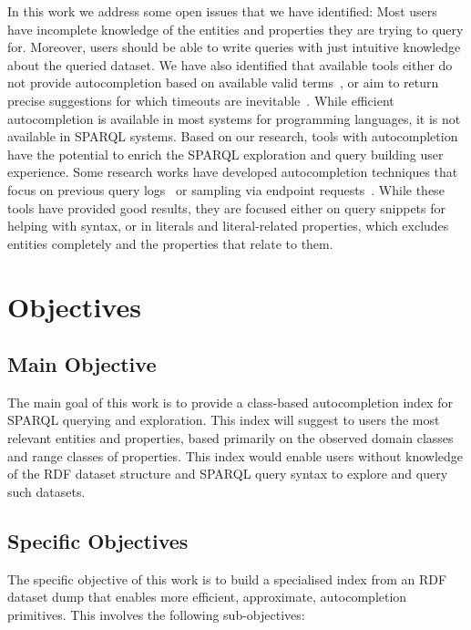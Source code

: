 In this work we address some open issues that we have identified: 
Most users have incomplete knowledge of the entities and properties they are trying to query for.
Moreover, users should be able to write queries with just intuitive knowledge about the queried dataset. 
We have also identified that available tools either do not provide autocompletion based on available valid terms~\cite{wikidataQueryService}, or aim to return precise suggestions for which timeouts are inevitable~\cite{Vargas2019}. 
While efficient autocompletion is available in most systems for programming languages, it is not available in SPARQL systems. 
Based on our research, tools with autocompletion have the potential to enrich the SPARQL exploration and query building user experience. 
Some research works have developed autocompletion techniques that focus on previous query logs~\cite{Rafes2018} or sampling via endpoint requests~\cite{El-Roby2016}. 
While these tools have provided good results, they are focused either on query snippets for helping with syntax, or in literals and literal-related properties, which excludes entities completely and the properties that relate to them. 

\section{Objectives}

\subsection{Main Objective}
The main goal of this work is to provide a class-based autocompletion index for SPARQL querying and exploration. 
This index will suggest to users the most relevant entities and properties, based primarily on the observed domain classes and range classes of properties.
This index would enable users without knowledge of the RDF dataset structure and SPARQL query syntax to explore and query such datasets.

\subsection{Specific Objectives}

The specific objective of this work is to build a specialised index from an RDF dataset dump that enables more efficient, approximate, autocompletion primitives. This involves the following sub-objectives:

